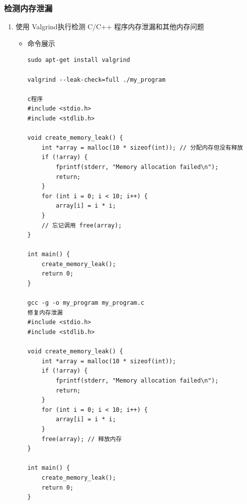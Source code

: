 \documentclass[UTF8]{ctexart}
\begin{document}
\subsubsection{检测内存泄漏}

\begin{enumerate}
  \item 使用 Valgrind执行检测 C/C++ 程序内存泄漏和其他内存问题
  \begin{itemize}
  \item 命令展示
  \begin{verbatim}
sudo apt-get install valgrind

valgrind --leak-check=full ./my_program

c程序
#include <stdio.h>
#include <stdlib.h>

void create_memory_leak() {
    int *array = malloc(10 * sizeof(int)); // 分配内存但没有释放
    if (!array) {
        fprintf(stderr, "Memory allocation failed\n");
        return;
    }
    for (int i = 0; i < 10; i++) {
        array[i] = i * i;
    }
    // 忘记调用 free(array);
}

int main() {
    create_memory_leak();
    return 0;
}

gcc -g -o my_program my_program.c
修复内存泄漏
#include <stdio.h>
#include <stdlib.h>

void create_memory_leak() {
    int *array = malloc(10 * sizeof(int));
    if (!array) {
        fprintf(stderr, "Memory allocation failed\n");
        return;
    }
    for (int i = 0; i < 10; i++) {
        array[i] = i * i;
    }
    free(array); // 释放内存
}

int main() {
    create_memory_leak();
    return 0;
}


\end{verbatim}
\end{itemize}
\end{enumerate}
\end{document}
